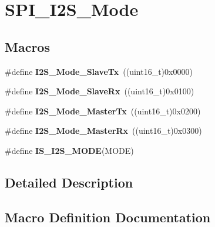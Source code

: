 \hypertarget{group___s_p_i___i2_s___mode}{}\section{S\+P\+I\+\_\+\+I2\+S\+\_\+\+Mode}
\label{group___s_p_i___i2_s___mode}
\subsection*{Macros}
\begin{DoxyCompactItemize}
\item 
\hypertarget{group___s_p_i___i2_s___mode_gadd5b20277198fcdb6aa53ea48e802ae5}{}\#define {\bfseries I2\+S\+\_\+\+Mode\+\_\+\+Slave\+Tx}~((uint16\+\_\+t)0x0000)\label{group___s_p_i___i2_s___mode_gadd5b20277198fcdb6aa53ea48e802ae5}

\item 
\hypertarget{group___s_p_i___i2_s___mode_gaaf62ee0353476afc9612dc2933e1c5c5}{}\#define {\bfseries I2\+S\+\_\+\+Mode\+\_\+\+Slave\+Rx}~((uint16\+\_\+t)0x0100)\label{group___s_p_i___i2_s___mode_gaaf62ee0353476afc9612dc2933e1c5c5}

\item 
\hypertarget{group___s_p_i___i2_s___mode_ga3a62ee8964033a3f6fd030da9e40fba6}{}\#define {\bfseries I2\+S\+\_\+\+Mode\+\_\+\+Master\+Tx}~((uint16\+\_\+t)0x0200)\label{group___s_p_i___i2_s___mode_ga3a62ee8964033a3f6fd030da9e40fba6}

\item 
\hypertarget{group___s_p_i___i2_s___mode_gabf9f872cda7c0f159c5fc18aed44e973}{}\#define {\bfseries I2\+S\+\_\+\+Mode\+\_\+\+Master\+Rx}~((uint16\+\_\+t)0x0300)\label{group___s_p_i___i2_s___mode_gabf9f872cda7c0f159c5fc18aed44e973}

\item 
\#define {\bfseries I\+S\+\_\+\+I2\+S\+\_\+\+M\+O\+D\+E}(M\+O\+D\+E)
\end{DoxyCompactItemize}


\subsection{Detailed Description}


\subsection{Macro Definition Documentation}
\hypertarget{group___s_p_i___i2_s___mode_ga942c37b2c1274c4c5773ddcf8b46d9b5}{}
